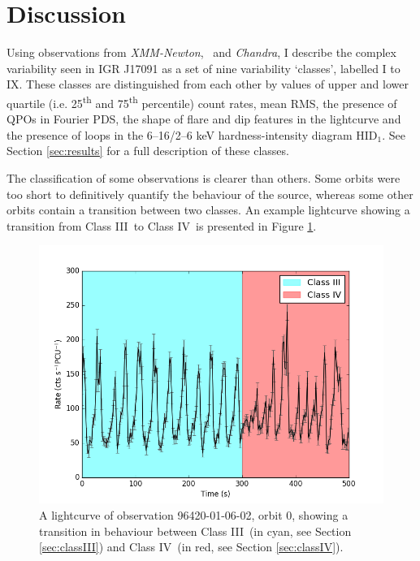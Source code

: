 \section{Discussion}

\par Using observations from \indexxmm\textit{XMM-Newton}, \indexrxte\rxte\ and \indexchandra\textit{Chandra}, I describe the complex variability seen in IGR J17091 as a set of nine variability `classes', labelled I to IX.  These classes are distinguished from each other by values of upper and lower quartile (i.e. 25\textsuperscript{th} and 75\textsuperscript{th} percentile) count rates, mean RMS, the presence of QPOs in Fourier PDS, the shape of flare and dip features in the lightcurve and the presence of loops in the 6--16/2--6 keV hardness-intensity diagram HID$_1$.  See Section \ref{sec:results} for a full description of these classes.
\par The classification of some observations is clearer than others.  Some orbits were too short to definitively quantify the behaviour of the source, whereas some other orbits contain a transition between two classes.  An example lightcurve showing a transition from Class III\indexiii\ to Class IV\indexiv\ is presented in Figure \ref{fig:HybridClasses}.

\begin{figure}
    \includegraphics[width=\columnwidth, trim =0cm 0 0cm 0]{images/mixJandK.png}
    \captionsetup{singlelinecheck=off}
    \caption[A lightcurve of observation 96420-01-06-02, showing a transition in behaviour between Classes IV and V.]{A lightcurve of observation 96420-01-06-02, orbit 0, showing a transition in behaviour between Class III\indexiii\ (in cyan, see Section \ref{sec:classIII}) and Class IV\indexiv\ (in red, see Section \ref{sec:classIV}).}
   \label{fig:HybridClasses}
\end{figure}


